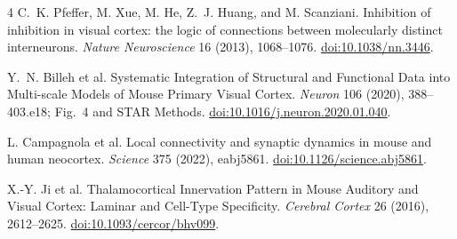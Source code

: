 \documentclass[11pt]{article}
\begin{document}

\begin{thebibliography}{4}
C.~K. Pfeffer, M. Xue, M. He, Z.~J. Huang, and M. Scanziani.
Inhibition of inhibition in visual cortex: the logic of connections between
molecularly distinct interneurons.
\emph{Nature Neuroscience} 16 (2013), 1068--1076.
\href{https://doi.org/10.1038/nn.3446}{doi:10.1038/nn.3446}.

Y.~N. Billeh et al.
Systematic Integration of Structural and Functional Data into Multi-scale
Models of Mouse Primary Visual Cortex.
\emph{Neuron} 106 (2020), 388--403.e18; Fig.~4 and STAR Methods.
\href{https://doi.org/10.1016/j.neuron.2020.01.040}{doi:10.1016/j.neuron.2020.01.040}.

L. Campagnola et al.
Local connectivity and synaptic dynamics in mouse and human neocortex.
\emph{Science} 375 (2022), eabj5861.
\href{https://doi.org/10.1126/science.abj5861}{doi:10.1126/science.abj5861}.

X.-Y. Ji et al.
Thalamocortical Innervation Pattern in Mouse Auditory and Visual Cortex:
Laminar and Cell-Type Specificity.
\emph{Cerebral Cortex} 26 (2016), 2612--2625.
\href{https://doi.org/10.1093/cercor/bhv099}{doi:10.1093/cercor/bhv099}.
\end{thebibliography}
\end{document}
